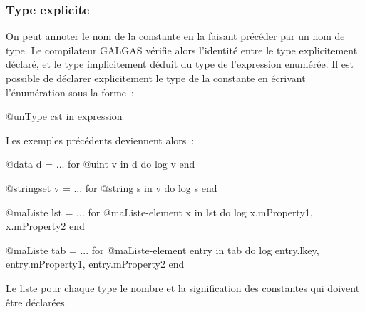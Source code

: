 \subsubsection{Type explicite}

On peut annoter le nom de la constante en la faisant précéder par un nom de type. Le compilateur GALGAS vérifie alors l'identité entre le type explicitement déclaré, et le type implicitement déduit du type de l'expression enumérée. Il est possible de déclarer explicitement le type de la constante en écrivant l'énumération sous la forme~:

\begin{galgas3}
@unType cst in expression
\end{galgas3}

Les exemples précédents deviennent alors~:

\begin{galgas3}
@data d = ...
for @uint v in d do
  log v
end
\end{galgas3}



\begin{galgas3}
@stringset v = ...
for @string s in v do
  log s
end
\end{galgas3}


\begin{galgas3}
@maListe lst = ...
for @maListe-element x in lst do
  log x.mProperty1, x.mProperty2
end
\end{galgas3}


\begin{galgas3}
@maListe tab = ...
for @maListe-element entry in tab do
  log entry.lkey, entry.mProperty1, entry.mProperty2
end
\end{galgas3}




Le  liste pour chaque type le nombre et la signification des constantes qui doivent être déclarées.

